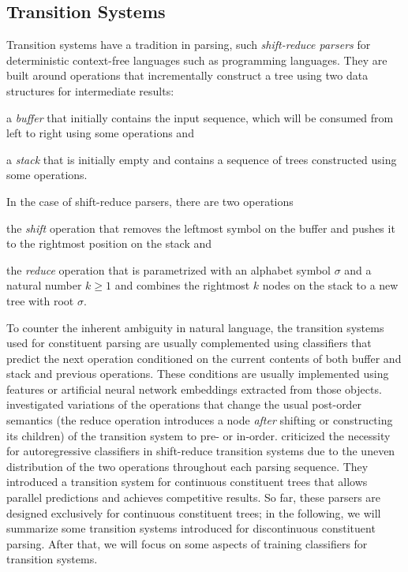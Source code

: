 \documentclass[../document.tex]{subfiles}
\begin{document}
    \subsection{Transition Systems}\label{sec:literature:transition}
    Transition systems have a tradition in parsing, such \emph{shift-reduce parsers} for deterministic context-free languages such as programming languages. \citep{}
    They are built around operations that incrementally construct a tree using two data structures for intermediate results:
    \begin{compactitem}
        \item a \emph{buffer} that initially contains the input sequence, which will be consumed from left to right using some operations and
        \item a \emph{stack} that is initially empty and contains a sequence of trees constructed using some operations.
    \end{compactitem}
    In the case of shift-reduce parsers, there are two operations
    \begin{compactitem}
        \item the \emph{shift} operation that removes the leftmost symbol on the buffer and pushes it to the rightmost position on the stack and
        \item the \emph{reduce} operation that is parametrized with an alphabet symbol \(\sigma\) and a natural number \(k \ge 1\) and combines the rightmost \(k\) nodes on the stack to a new tree with root \(\sigma\).
    \end{compactitem}
    To counter the inherent ambiguity in natural language, the transition systems used for constituent parsing are usually complemented using classifiers that predict the next operation conditioned on the current contents of both buffer and stack and previous operations. 
    These conditions are usually implemented using features or artificial neural network embeddings extracted from those objects.
    \citet{liu-zhang-2017-order} investigated variations of the operations that change the usual post-order semantics (the reduce operation introduces a node \emph{after} shifting or constructing its children) of the transition system to pre- or in-order.
    \cite{kitaev-klein-2020-tetra} criticized the necessity for autoregressive classifiers in shift-reduce transition systems due to the uneven distribution of the two operations throughout each parsing sequence.
    They introduced a transition system for continuous constituent trees that allows parallel predictions and achieves competitive results.
    So far, these parsers are designed exclusively for continuous constituent trees; in the following, we will summarize some transition systems introduced for discontinuous constituent parsing.
    After that, we will focus on some aspects of training classifiers for transition systems.
\end{document}
